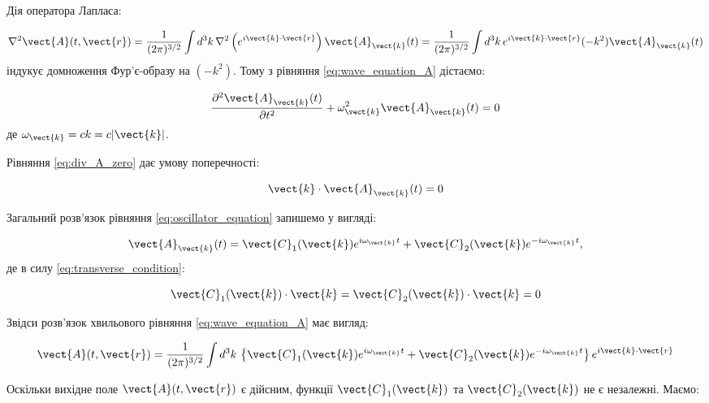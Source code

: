 Дія оператора Лапласа:

\begin{equation*}
\nabla^2 \vect{A}(t, \vect{r}) = \frac{1}{(2\pi)^{3/2}} \int d^3k \, \nabla^2 \left( e^{i\vect{k} \cdot \vect{r}} \right) \vect{A}_{\vect{k}}(t) =
\frac{1}{(2\pi)^{3/2}} \int d^3k \, e^{i\vect{k} \cdot \vect{r}} (-k^2) \vect{A}_{\vect{k}}(t)
\end{equation*}
індукує домноження Фур’є-образу на \((-k^2)\). Тому з рівняння \eqref{eq:wave_equation_A} дістаємо:

\begin{equation}
\frac{\partial^2 \vect{A}_{\vect{k}}(t)}{\partial t^2} + \omega_{\vect{k}}^2 \vect{A}_{\vect{k}}(t) = 0
\label{eq:oscillator_equation}
\end{equation}
де \(\omega_{\vect{k}} = ck = c|\vect{k}|\).

Рівняння \eqref{eq:div_A_zero} дає умову поперечності:

\begin{equation}
\vect{k} \cdot \vect{A}_{\vect{k}}(t) = 0
\label{eq:transverse_condition}
\end{equation}

Загальний розв’язок рівняння \eqref{eq:oscillator_equation} запишемо у вигляді:

\begin{equation}
\vect{A}_{\vect{k}}(t) = \vect{C}_1(\vect{k}) e^{i\omega_{\vect{k}} t} + \vect{C}_2(\vect{k}) e^{-i\omega_{\vect{k}} t},
\label{eq:general_solution_Ak}
\end{equation}
де в силу \eqref{eq:transverse_condition}:

\begin{equation*}
\vect{C}_1(\vect{k}) \cdot \vect{k} = \vect{C}_2(\vect{k}) \cdot \vect{k} = 0
\end{equation*}

Звідси розв’язок хвильового рівняння \eqref{eq:wave_equation_A} має вигляд:

\begin{equation}
\vect{A}(t, \vect{r}) = \frac{1}{(2\pi)^{3/2}} \int d^3k \, \left\{ \vect{C}_1(\vect{k}) e^{i\omega_{\vect{k}} t} + \vect{C}_2(\vect{k})
e^{-i\omega_{\vect{k}} t} \right\} e^{i\vect{k} \cdot \vect{r}}
\label{eq:general_solution_A}
\end{equation}

Оскільки вихідне поле \(\vect{A}(t, \vect{r})\) є дійсним, функції \(\vect{C}_1(\vect{k})\) та \(\vect{C}_2(\vect{k})\) не є незалежні. Маємо:

